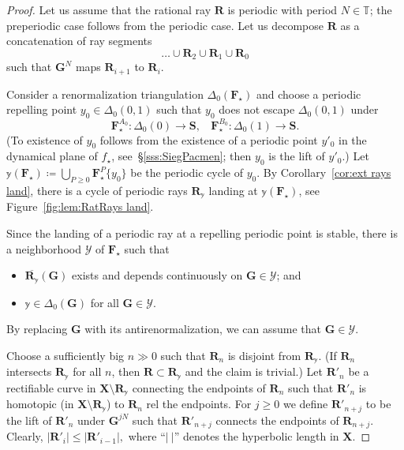 \documentclass{amsart}
\renewcommand{\sp}{{\ \ }}
\newcommand{\1}{{\mathbb 1 }}
\newcommand\PT{\mathbb{ T}}
\newcommand\YY{\mathcal{Y}}
\newcommand{\bDelta}{{\mathbb{\Delta}}}
\newcommand{\bF}{{\mathbf F}}
\newcommand{\bX}{{\mathbf X}}
\newcommand{\bR}{{\mathbf R}}
\newcommand{\bS}{{\mathbf S}}
\newcommand{\bG}{{\mathbf G}}
\newcommand{\str}{{\star}}
\newcommand{\byy}{{\mathbb{y}}}
\theoremstyle{remark}
\numberwithin{equation}{section}
\theoremstyle{definition}
\theoremstyle{nonumberbreak}
\begin{document}
\begin{proof}
Let us assume that the rational ray $\bR$ is periodic with period $N\in \PT$; the preperiodic case follows from the periodic case. Let us decompose $\bR$ as a concatenation of ray segments \[ \dots  \cup \bR_{2}\cup \bR_{1}\cup \bR_0\]
such that $\bG^N$ maps $\bR_{i+1}$ to $\bR_{i}$. 
 



Consider a renormalization triangulation $\bDelta_0(\bF_\str)$ and choose a periodic repelling point $y_0\in \Delta_0(0,1)$ such that $y_0$ does not escape $\Delta_0(0,1)$ under
\[\bF_\str^{A_0}\colon \Delta_0(0)\to \bS,\sp\sp \bF_\str^{B_0}\colon \Delta_0(1)\to \bS.\] 
(To existence of $y_0$ follows from the existence of a periodic point $y'_0$ in the dynamical plane of $f_\str$, see~\S\ref{sss:SiegPacmen}; then $y_0$ is the lift of $y'_0$.) Let $\byy(\bF_\str)\coloneqq \displaystyle\bigcup_{P\ge 0}\bF^{P}_\str
\{y_0\}$ be the periodic cycle of $y_0$. By Corollary~\ref{cor:ext rays land}, there is a cycle of periodic rays $\bR_\byy$ landing at $\byy(\bF_\str)$, see Figure~\ref{fig:lem:RatRays land}. 

Since the landing of a periodic ray at a repelling periodic point is stable,  there is a neighborhood $\YY$ of $\bF_\str$ such that 
\begin{itemize}
\item $\overline{\bR_\byy}(\bG)$ exists and depends continuously on $\bG\in \YY$; and 
\item $\byy\in \bDelta_0(\bG)$ for all $\bG\in \YY$.
\end{itemize}
By replacing $\bG$ with its antirenormalization, we can assume that $\bG\in \YY$.


Choose a sufficiently big $n\gg 0$ such that $\bR_n$ is disjoint from $\bR_\byy$. (If $\bR_n$ intersects $\bR_\byy$ for all $n$, then $\bR\subset \bR_\byy$ and the claim is trivial.) Let $\bR'_n$ be a rectifiable curve in $\bX\setminus \bR_\byy$ connecting the endpoints of $\bR_n$ such that $\bR'_n$ is homotopic (in $\bX\setminus \bR_\byy$) to $\bR_n$ rel the endpoints. For $j\ge 0$ we define $\bR'_{n+j}$ to be the lift of $\bR'_n$ under $\bG^{jN}$ such that $\bR'_{n+j}$  connects the endpoints of $\bR_{n+j}$. Clearly, $|\bR'_i|\le  |\bR'_{i-1}|,$ where ``$|~|$'' denotes the hyperbolic length in $\bX$. 


\end{proof}
\end{document}

